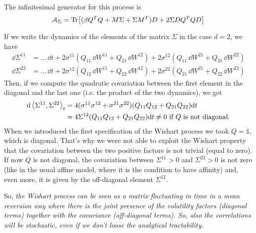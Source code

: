 The infinitesimal generator for this process is
\begin{equation}
    \mathcal{A}_{\Sigma} = \Tr[(\beta Q^TQ + M\Sigma + \Sigma M^T)D + 2\Sigma DQ^TQD]
\end{equation}
\begin{remark}
    If we write the dynamics of the elements of the matrix $\Sigma$ in the case $d=2$, we have
    \begin{align*}
        \dd\Sigma^{11} &= \dots\,\dd t + 2\sigma^{11}(Q_{11}\,\dd W^{11} + Q_{21}\,\dd W^{12}) + 2\sigma^{12}(Q_{11}\,\dd W^{21}+Q_{21}\,\dd W^{22}) \\
        \dd\Sigma^{22} &= \dots\,\dd t + 2\sigma^{12}(Q_{12}\,\dd W^{11} + Q_{22}\,\dd W^{12}) + 2\sigma^{22}(Q_{21}\,\dd W^{21}+Q_{22}\,\dd W^{22})
    \end{align*}
    Then, if we compute the quadratic covariation between the first element in the diagonal and the last one (i.e. the product of the two dynamics), we get
    \begin{align*}
        \dd\expval{\Sigma^{11},\Sigma^{22}}_t &= 4(\sigma^{11}\sigma^{12} + \sigma^{21}\sigma^{22})(Q_{11}Q_{12} + Q_{21}Q_{22})\dd t \\
        &=
        4\Sigma^{12}(Q_{11}Q_{12} + Q_{21}Q_{22})\dd t \ne 0 \text{  if $Q$ is not diagonal.}
    \end{align*}
    When we introduced the first specification of the Wishart process we took $Q = \mathds{1}$, which is diagonal. That's why we were not able to exploit the Wishart property that the covariation between the two positive factors is not trivial (equal to zero). If now $Q$ is not diagonal, the covariation between $\Sigma^{11}>0$ and $\Sigma^{22}>0$ is not zero (like in the usual affine model, where it is the condition to have affinity) and, even more, it is given by the off-diagonal element $\Sigma^{12}$.
\end{remark}
So, \emph{the Wishart process can be seen as a matrix fluctuating in time in a mean reversion way where there is the joint presence of the volatility factors (diagonal terms) together with the covariance (off-diagonal terms). So, also the correlations will be stochastic, even if we don't loose the analytical tractability.}
